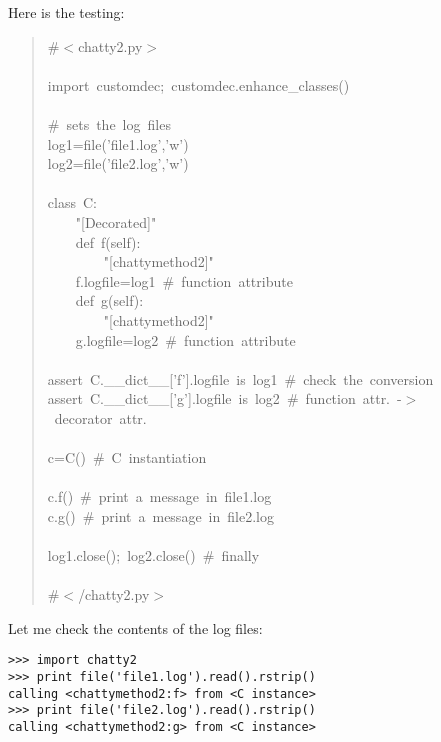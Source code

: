 \documentclass[11pt,english]{article}
\begin{document}
Here is the testing:
\begin{quote}
\begin{ttfamily}\begin{flushleft}
\mbox{{\#}{$<$}chatty2.py{$>$}}\\
\mbox{}\\
\mbox{import~customdec;~customdec.enhance{\_}classes()}\\
\mbox{}\\
\mbox{{\#}~sets~the~log~files}\\
\mbox{log1=file('file1.log','w')}\\
\mbox{log2=file('file2.log','w')}\\
\mbox{}\\
\mbox{class~C:}\\
\mbox{~~~~"[Decorated]"}\\
\mbox{~~~~def~f(self):~}\\
\mbox{~~~~~~~~"[chattymethod2]"}\\
\mbox{~~~~f.logfile=log1~{\#}~function~attribute}\\
\mbox{~~~~def~g(self):~}\\
\mbox{~~~~~~~~"[chattymethod2]"}\\
\mbox{~~~~g.logfile=log2~{\#}~function~attribute}\\
\mbox{}\\
\mbox{assert~C.{\_}{\_}dict{\_}{\_}['f'].logfile~is~log1~{\#}~check~the~conversion~}\\
\mbox{assert~C.{\_}{\_}dict{\_}{\_}['g'].logfile~is~log2~{\#}~function~attr.~-{$>$}~decorator~attr.}\\
\mbox{}\\
\mbox{c=C()~{\#}~C~instantiation}\\
\mbox{}\\
\mbox{c.f()~{\#}~print~a~message~in~file1.log}\\
\mbox{c.g()~{\#}~print~a~message~in~file2.log}\\
\mbox{}\\
\mbox{log1.close();~log2.close()~{\#}~finally}\\
\mbox{}\\
\mbox{{\#}{$<$}/chatty2.py{$>$}}
\end{flushleft}\end{ttfamily}
\end{quote}

Let me check the contents of the log files:
\begin{verbatim}>>> import chatty2
>>> print file('file1.log').read().rstrip()
calling <chattymethod2:f> from <C instance>
>>> print file('file2.log').read().rstrip()
calling <chattymethod2:g> from <C instance>\end{verbatim}
\end{document}
